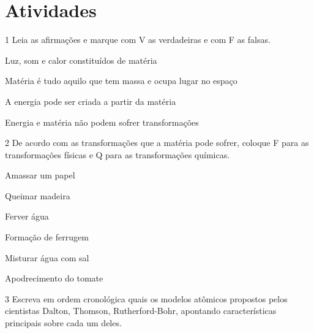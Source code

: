 \section*{Atividades}

\num{1}  Leia as afirmações e marque com V as verdadeiras e com F as falsas.

\begin{boxlist}
 Luz, som e calor constituídos de matéria

 Matéria é tudo aquilo que tem massa e ocupa lugar no espaço

 A energia pode ser criada a partir da matéria

 Energia e matéria não podem sofrer transformações
\end{boxlist}


\num{2}  De acordo com as transformações que a matéria pode sofrer, coloque F para as transformações físicas e Q para as transformações químicas.

\begin{boxlist}
 Amassar um papel

 Queimar madeira

 Ferver água

 Formação de ferrugem

 Misturar água com sal

 Apodrecimento do tomate
\end{boxlist}

\pagebreak
\num{3} Escreva em ordem cronológica quais os modelos atômicos propostos pelos cientistas Dalton, Thomson, Rutherford-Bohr, apontando características principais sobre cada um deles.



